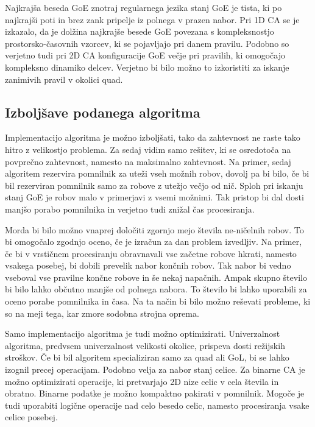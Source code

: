 \documentclass[12pt,a4paper,openany,twoside]{book}
\begin{document}
Najkrajša beseda GoE znotraj regularnega jezika stanj GoE je tista,
ki po najkrajši poti in brez zank pripelje iz polnega v prazen nabor.
Pri 1D CA se je izkazalo, da je dolžina najkrajše besede GoE povezana s kompleksnostjo
prostorsko-časovnih vzorcev, ki se pojavljajo pri danem pravilu.
Podobno so verjetno tudi pri 2D CA konfiguracije GoE večje pri pravilih,
ki omogočajo kompleksno dinamiko delcev. Verjetno bi bilo možno to izkoristiti
za iskanje zanimivih pravil v okolici quad.

\subsection{Izboljšave podanega algoritma}

Implementacijo algoritma je možno izboljšati, tako da zahtevnost
ne raste tako hitro z velikostjo problema.
Za sedaj vidim samo rešitev, ki se osredotoča na povprečno zahtevnost, namesto na maksimalno zahtevnost.
Na primer, sedaj algoritem rezervira pomnilnik za uteži vseh možnih robov,
dovolj pa bi bilo, če bi bil rezerviran pomnilnik samo za robove z utežjo večjo od nič.
Sploh pri iskanju stanj GoE je robov malo v primerjavi z vsemi možnimi.
Tak pristop bi dal dosti manjšo porabo pomnilnika
in verjetno tudi znižal čas procesiranja.

Morda bi bilo možno vnaprej določiti zgornjo mejo števila ne-ničelnih robov.
To bi omogočalo zgodnjo oceno, če je izračun za dan problem izvedljiv.
Na primer, če bi v vrstičnem procesiranju obravnavali vse začetne robove hkrati,
namesto vsakega posebej, bi dobili prevelik nabor končnih robov.
Tak nabor bi vedno vseboval vse pravilne končne robove in še nekaj napačnih.
Ampak skupno število bi bilo lahko občutno manjše od polnega nabora.
To število bi lahko uporabili za oceno porabe pomnilnika in časa.
Na ta način bi bilo možno reševati probleme, ki so na meji tega,
kar zmore sodobna strojna oprema.

Samo implementacijo algoritma je tudi možno optimizirati.
Univerzalnost algoritma, predvsem univerzalnost velikosti okolice,
prispeva dosti režijskih stroškov. Če bi bil algoritem specializiran
samo za quad ali GoL, bi se lahko izognil precej operacijam.
Podobno velja za nabor stanj celice. Za binarne CA je možno optimizirati
operacije, ki pretvarjajo 2D nize celic v cela števila in obratno.
Binarne podatke je možno kompaktno pakirati v pomnilnik.
Mogoče je tudi uporabiti logične operacije nad celo besedo celic,
namesto procesiranja vsake celice posebej.
\end{document}
